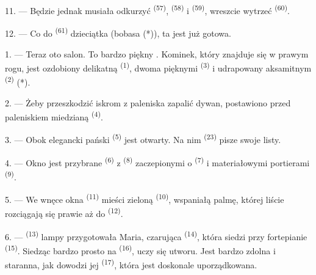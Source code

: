 

11. --- Będzie jednak musiała odkurzyć  \textsuperscript{(57)},
 \textsuperscript{(58)} i 
\textsuperscript{(59)}, wreszcie wytrzeć  \textsuperscript{(60)}.

12. --- Co do  \textsuperscript{(61)} dzieciątka (bobasa (*)), ta jest
już gotowa.

\VUsaut{5.0mm}
\VUsaut{3.0mm}

1. --- Teraz oto salon. To bardzo piękny . Kominek, który znajduje się w
prawym rogu, jest ozdobiony delikatną  \textsuperscript{(1)}, dwoma
pięknymi  \textsuperscript{(3)} i udrapowany aksamitnym
 \textsuperscript{(2)} (*).

2. --- Żeby przeszkodzić iskrom z paleniska zapalić dywan, postawiono przed paleniskiem
miedzianą  \textsuperscript{(4)}.

3. --- Obok elegancki pański  \textsuperscript{(5)} jest otwarty.
Na nim  \textsuperscript{(23)} pisze swoje listy.

4. --- Okno jest przybrane  \textsuperscript{(6)} z
 \textsuperscript{(8)} zaczepionymi o 
\textsuperscript{(7)} i materiałowymi portierami 
\textsuperscript{(9)}.

5. --- We wnęce okna  \textsuperscript{(11)} mieści zieloną
 \textsuperscript{(10)}, wspaniałą palmę, której liście rozciągają się
prawie aż do  \textsuperscript{(12)}.

6. ---  \textsuperscript{(13)} lampy przygotowała Maria, czarująca
 \textsuperscript{(14)}, która siedzi przy fortepianie
\textsuperscript{(15)}. Siedząc bardzo prosto na 
\textsuperscript{(16)}, uczy się utworu. Jest bardzo zdolna i staranna, jak dowodzi jej
 \textsuperscript{(17)}, która jest doskonale uporządkowana.

